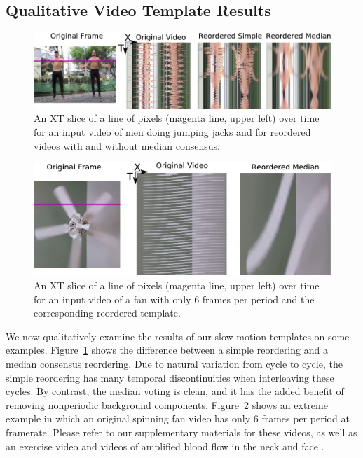 \documentclass{article}
\begin{document}
\subsection{Qualitative Video Template Results}
\begin{figure}
\centering
\includegraphics[width=\columnwidth]{XTSliceJumpingJacks.pdf}
\caption{An XT slice of a line of pixels (magenta line, upper left) over time for an input video of men doing jumping jacks and for reordered videos with and without median consensus.}
\label{fig:XTSliceJumpingJacks}
\end{figure}

\begin{figure}
\centering
\includegraphics[width=\columnwidth]{XTSliceFan.pdf}
\caption{An XT slice of a line of pixels (magenta line, upper left) over time for an input video of a fan with only 6 frames per period and the corresponding reordered template.}
\label{fig:XTSliceFan}
\end{figure}

We now qualitatively examine the results of our slow motion templates on some examples.  Figure~\ref{fig:XTSliceJumpingJacks} shows the difference between a simple reordering and a median consensus reordering.  Due to natural variation from cycle to cycle, the simple reordering has many temporal discontinuities when interleaving these cycles.  By contrast, the median voting is clean, and it has the added benefit of removing nonperiodic background components.  Figure~\ref{fig:XTSliceFan} shows an extreme example in which an original spinning fan video has only 6 frames per period at framerate.  Please refer to our supplementary materials for these videos, as well as an exercise video \cite{levy2015live} and videos of amplified blood flow in the neck \cite{wadhwa2013phase} and face \cite{wu2012eulerian}.
\end{document}
